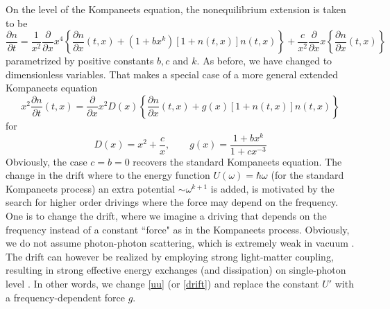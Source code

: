 \documentclass[a4paper,12pt,reqno,superscriptaddress,nofootinbib]{revtex4}
\newcommand{\0}{^{(0)}}
\newcommand{\1}{^{(1)}}
\newcommand{\2}{^{(2)}}
\begin{document}
On the level of the Kompaneets equation, the nonequilibrium extension is taken to be
\begin{equation}\label{extk}
\frac{\partial n}{\partial t}=\frac{1}{x^2}\frac{\partial}{\partial x} x^4 \left\{  \frac{\partial n}{\partial x} (t,x) +  (1+bx^k)[1+n(t,x)]n(t,x)\right\} + \frac{c}{x^2}\frac{\partial}{\partial x} x \left\{  \frac{\partial n}{\partial x} (t,x)\right\}
\end{equation}
parametrized by positive constants $b,c$ and $k$.
As before, we have changed to dimensionless variables.  That makes a special case of a more general extended Kompaneets equation
\begin{equation}\label{aeke}
	x^2 \frac{\partial n}{\partial t}(t,x) = \frac{\partial}{\partial x} x^2 D(x)\left\{  \frac{\partial n}{\partial x} (t,x) +  g(x)[1+n(t,x)]n(t,x)\right\}
\end{equation}
for
 \begin{equation}\label{ext-dri}
D(x)= x^2 + \frac c{x},\qquad  g(x)=\frac{1 + bx^k}{1+cx^{-3}}
\end{equation}
Obviously, the case $c=b=0$ recovers the standard Kompaneets equation.  
The change in the drift where to the energy function $U(\omega) = \hbar\omega$ (for the standard Kompaneets process) an extra potential $\sim \omega^{k+1}$ is added, is motivated by the search for higher order drivings where the force  may depend on the frequency. One is to change the drift, where we imagine a driving that depends on the frequency instead of a constant ``force" as in the Kompaneets process.  Obviously, we do not assume photon-photon scattering, which is extremely weak in vacuum \cite{silveira}. The drift can however be realized by employing strong light-matter coupling, resulting in strong effective energy exchanges (and dissipation) on single-photon level \cite{roy2}.  In other words, we change \eqref{uu}  (or \eqref{drift}) and replace the constant $U'$ with a frequency-dependent force $g$.\\
\end{document}
